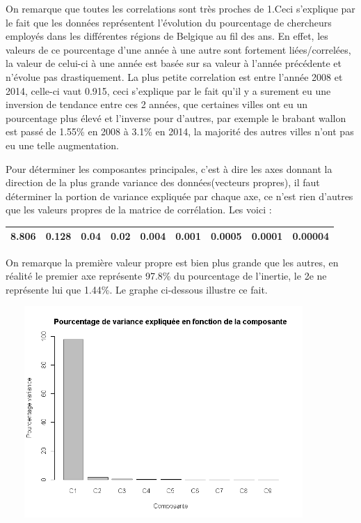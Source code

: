 \documentclass{article}
\begin{document}
On remarque que toutes les correlations sont très proches de 1.Ceci s'explique par le fait que les données représentent l'évolution du pourcentage de chercheurs employés dans les différentes régions de Belgique au fil des ans. En effet, les valeurs de ce pourcentage d'une année à une autre sont fortement liées/correlées, la valeur de celui-ci à une année est basée sur sa valeur à l'année précédente et n'évolue pas drastiquement. La plus petite correlation est entre l'année 2008 et 2014, celle-ci vaut 0.915, ceci s'explique par le fait qu'il y a surement eu une inversion de tendance entre ces 2 années, que certaines villes ont eu un pourcentage plus élevé et l'inverse pour d'autres, par exemple le brabant wallon est passé de 1.55\% en 2008 à 3.1\% en 2014, la majorité des autres villes n'ont pas eu une telle augmentation.

Pour déterminer les composantes principales, c'est à dire les axes donnant la direction de la plus grande variance des données(vecteurs propres), il faut déterminer la portion de variance expliquée par chaque axe, ce n'est rien d'autres que les valeurs propres de la matrice de corrélation. Les voici :
\begin{table}[h]
\centering 
\begin{tabular}{|c|c|c|c|c|c|c|c|c|} 
  \hline
  8.806 & 0.128 & 0.04 & 0.02 & 0.004 & 0.001 & 0.0005 & 0.0001 & 0.00004 \\
  \hline
\end{tabular}
\end{table}
\newpage
On remarque la première valeur propre est bien plus grande que les autres, en réalité le premier axe représente 97.8\% du pourcentage de l'inertie, le 2e ne représente lui que 1.44\%. Le graphe ci-dessous illustre ce fait.

 \includegraphics[width=12cm,height=8cm]{"screebar"}
 
\end{document}
